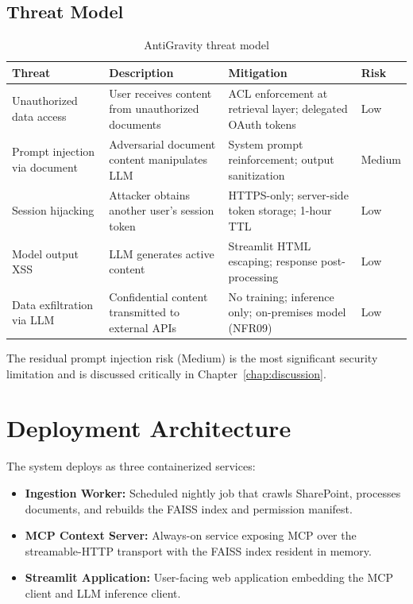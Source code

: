 \subsection{Threat Model}

\begin{table}[H]
\centering
\caption{AntiGravity threat model}
\label{tab:threat-model}
\begin{tabularx}{\textwidth}{@{}lXXl@{}}
\toprule
\textbf{Threat} & \textbf{Description} & \textbf{Mitigation} & \textbf{Risk} \\
\midrule
Unauthorized data access & User receives content from unauthorized documents & ACL enforcement at retrieval layer; delegated OAuth tokens & Low \\
Prompt injection via document & Adversarial document content manipulates LLM & System prompt reinforcement; output sanitization & Medium \\
Session hijacking & Attacker obtains another user's session token & HTTPS-only; server-side token storage; 1-hour TTL & Low \\
Model output XSS & LLM generates active content & Streamlit HTML escaping; response post-processing & Low \\
Data exfiltration via LLM & Confidential content transmitted to external APIs & No training; inference only; on-premises model (NFR09) & Low \\
\bottomrule
\end{tabularx}
\end{table}

The residual prompt injection risk (Medium) is the most significant security limitation and is discussed critically in Chapter~\ref{chap:discussion}.

\section{Deployment Architecture}
\label{sec:arch-deployment}

The system deploys as three containerized services:

\begin{itemize}
  \item \textbf{Ingestion Worker:} Scheduled nightly job that crawls SharePoint, processes documents, and rebuilds the FAISS index and permission manifest.
  \item \textbf{MCP Context Server:} Always-on service exposing MCP over the streamable-HTTP transport with the FAISS index resident in memory.
  \item \textbf{Streamlit Application:} User-facing web application embedding the MCP client and LLM inference client.
\end{itemize}

